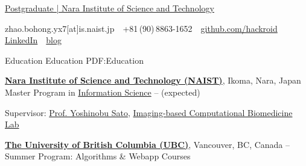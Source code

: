 \documentclass[a4paper,MMMyyyy,nonstopmode]{simpleresumecv}
\newcommand{\CVAuthor}{Bohong ZHAO}
\begin{document}

\Title{\CVAuthor}

\begin{SubTitle}
    \href{http://www.naist.jp/en/}
    {Postgraduate | Nara Institute of Science and Technology}
    \par
    zhao.bohong.yx7[at]is.naist.jp
    \,\SubBulletSymbol\,
    +81\,(90)\,8863-1652
    \,\SubBulletSymbol\,
    \href{https://github.com/hackroid/}{github.com/hackroid}
    \,\SubBulletSymbol\,
    \href{https://www.linkedin.com/in/%E5%8D%9A%E5%BC%98-%E8%B5%B5-b7ab09136/}{LinkedIn}
    \,\SubBulletSymbol\,
    \href{https://hackroid.com}{blog}
\end{SubTitle}

\begin{Body}


    \Section
    {Education}
    {Education}
    {PDF:Education}

    \Entry
    \href{http://www.naist.jp/en/}
    {\textbf{Nara Institute of Science and Technology (NAIST)}},
    Ikoma, Nara, Japan
    \Gap
    \BulletItem
    Master Program in
    \href{http://isw3.naist.jp/home-en.html}
    {Information Science}
    \hfill
     --
     (expected)
    \begin{Detail}
        \SubBulletItem
        Supervisor: \href{http://icb-lab.naist.jp/members/yoshi/index.html}{Prof. Yoshinobu Sato}, \href{http://icb-lab.naist.jp/index.html}{Imaging-based Computational Biomedicine Lab}
    \end{Detail}

    \Gap

    \Entry
    \href{https://www.ubc.ca/}
    {\textbf{The University of British Columbia (UBC)}},
    Vancouver, BC, Canada
    \hfill
     --
    \BulletItem
    Summer Program: Algorithms \& Webapp Courses

    \Gap


\end{Body}
\end{document}
